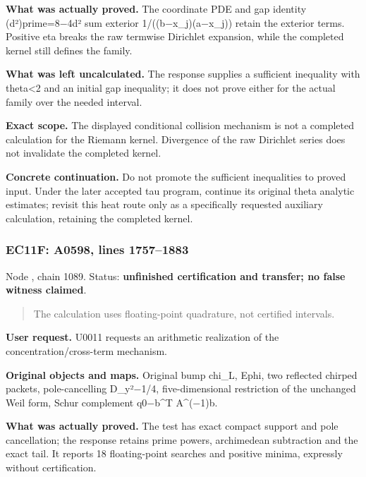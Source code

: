 \documentclass[10pt,a4paper,oneside]{report}
\begin{document}
\textbf{What was actually proved.} The coordinate PDE and gap identity
(d²)prime=8\allowbreak{}\ensuremath{−}\allowbreak{}4d² sum exterior
1/((b\allowbreak{}\ensuremath{−}\allowbreak{}x\_j)(a\allowbreak{}\ensuremath{−}\allowbreak{}x\_j))
retain the exterior terms. Positive eta breaks the raw termwise
Dirichlet expansion, while the completed kernel still defines the
family.

\textbf{What was left uncalculated.} The response supplies a sufficient
inequality with theta\textless2 and an initial gap inequality; it does
not prove either for the actual family over the needed interval.

\textbf{Exact scope.} The displayed conditional collision mechanism is
not a completed calculation for the Riemann kernel. Divergence of the
raw Dirichlet series does not invalidate the completed kernel.

\textbf{Concrete continuation.} Do not promote the sufficient
inequalities to proved input. Under the later accepted tau program,
continue its original theta analytic estimates; revisit this heat route
only as a specifically requested auxiliary calculation, retaining the
completed kernel.

\subsubsection{EC11F: A0598, lines
1757--1883}\label{ec11f-a0598-lines-17571883}

Node \protect{}, chain 1089.
Status: \textbf{unfinished certification and transfer; no false witness
claimed}.

\begin{quote}
The calculation uses floating-point quadrature, not certified intervals.
\end{quote}

\textbf{User request.} U0011 requests an arithmetic realization of the
concentration/cross-term mechanism.

\textbf{Original objects and maps.} Original bump chi\_L, Ephi, two
reflected chirped packets, pole-cancelling
D\_y²\allowbreak{}\ensuremath{−}\allowbreak{}1/4, five-dimensional
restriction of the unchanged Weil form, Schur complement
q0\allowbreak{}\ensuremath{−}\allowbreak{}b\textasciicircum{}T
A\textasciicircum{}(\allowbreak{}\ensuremath{−}\allowbreak{}1)b.

\textbf{What was actually proved.} The test has exact compact support
and pole cancellation; the response retains prime powers, archimedean
subtraction and the exact tail. It reports 18 floating-point searches
and positive minima, expressly without certification.
\end{document}
